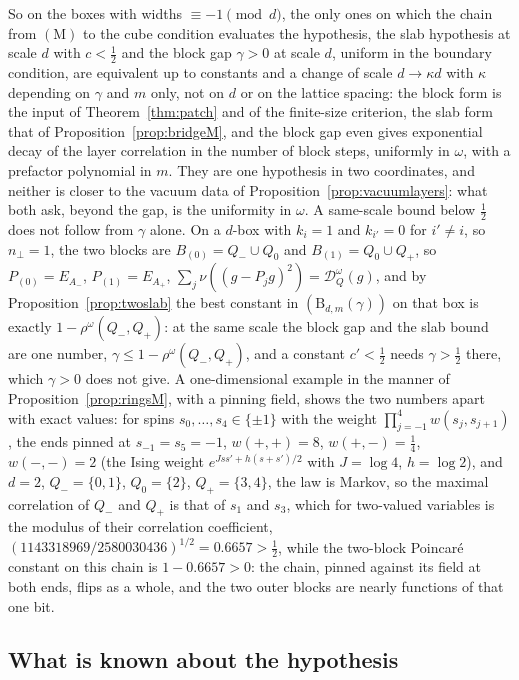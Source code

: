 So on the boxes with widths $\equiv-1\pmod d$, the only ones on which the
chain from $(\mathrm M)$ to the cube condition evaluates the hypothesis, the
slab hypothesis at scale $d$ with $c<\frac12$ and the block gap $\gamma>0$ at
scale $d$, uniform in the boundary condition, are equivalent up to constants
and a change of scale $d\to\kappa d$ with $\kappa$ depending on $\gamma$ and
$m$ only, not on $d$ or on the lattice spacing: the block form is the input of
Theorem~\ref{thm:patch} and of the finite-size criterion, the slab form that
of Proposition~\ref{prop:bridgeM}, and the block gap even gives exponential
decay of the layer correlation in the number of block steps, uniformly in
$\omega$, with a prefactor polynomial in $m$. They are one hypothesis in two
coordinates, and neither is closer to the vacuum data of
Proposition~\ref{prop:vacuumlayers}: what both ask, beyond the gap, is the
uniformity in $\omega$. A same-scale bound below $\frac12$ does not follow
from $\gamma$ alone. On a $d$-box with $k_i=1$ and $k_{i'}=0$ for $i'\ne i$,
so $n_\perp=1$, the two blocks are $B_{(0)}=Q_-\cup Q_0$ and $B_{(1)}=Q_0\cup
Q_+$, so $P_{(0)}=E_{A_-}$, $P_{(1)}=E_{A_+}$, $\sum_j\nu((g-P_jg)^2)=
\mathcal D^\omega_Q(g)$, and by Proposition~\ref{prop:twoslab} the best
constant in $(\mathrm B_{d,m}(\gamma))$ on that box is exactly $1-\rho^\omega
(Q_-,Q_+)$: at the same scale the block gap and the slab bound are one
number, $\gamma\le1-\rho^\omega(Q_-,Q_+)$, and a constant $c'<\frac12$ needs
$\gamma>\frac12$ there, which $\gamma>0$ does not give. A one-dimensional
example in the manner of Proposition~\ref{prop:ringsM}, with a pinning field,
shows the two numbers apart with exact values: for spins $s_0,\dots,s_4\in\{\pm1\}$ with the weight
$\prod_{j=-1}^{4}w(s_j,s_{j+1})$, the ends pinned at $s_{-1}=s_5=-1$, $w(+,+)
=8$, $w(+,-)=\frac14$, $w(-,-)=2$ (the Ising weight $e^{Jss'+h(s+s')/2}$ with
$J=\log4$, $h=\log2$), and $d=2$, $Q_-=\{0,1\}$, $Q_0=\{2\}$, $Q_+=\{3,4\}$,
the law is Markov, so the maximal correlation of $Q_-$ and $Q_+$ is that of
$s_1$ and $s_3$, which for two-valued variables is the modulus of their
correlation coefficient, $(1143318969/2580030436)^{1/2}=0.6657>\frac12$,
while the two-block Poincar\'e constant on this chain is $1-0.6657>0$: the
chain, pinned against its field at both ends, flips as a whole, and the two
outer blocks are nearly functions of that one bit.

\subsection{What is known about the hypothesis}

